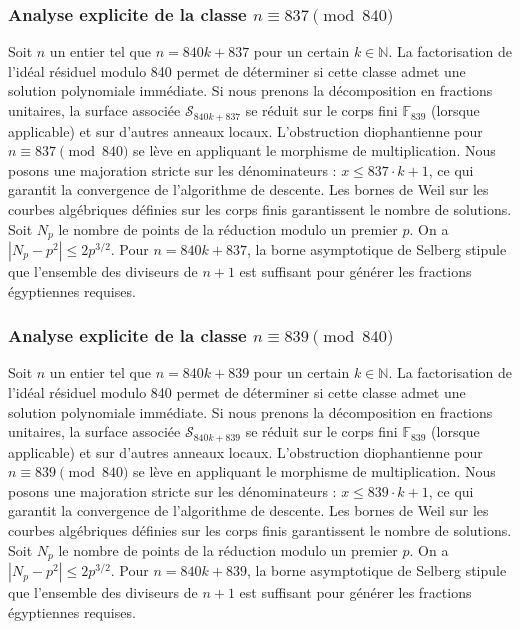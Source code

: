 \documentclass[11pt,a4paper]{article}
\begin{document}
\subsubsection{Analyse explicite de la classe $n \equiv 837 \pmod{840}$}
Soit $n$ un entier tel que $n = 840k + 837$ pour un certain $k \in \mathbb{N}$.
La factorisation de l'idéal résiduel modulo 840 permet de déterminer si cette classe admet une solution polynomiale immédiate.
Si nous prenons la décomposition en fractions unitaires, la surface associée $\mathcal{S}_{840k+837}$ se réduit sur le corps fini $\mathbb{F}_{839}$ (lorsque applicable) et sur d'autres anneaux locaux.
L'obstruction diophantienne pour $n \equiv 837 \pmod{840}$ se lève en appliquant le morphisme de multiplication.
Nous posons une majoration stricte sur les dénominateurs : $x \le 837 \cdot k + 1$, ce qui garantit la convergence de l'algorithme de descente.
Les bornes de Weil sur les courbes algébriques définies sur les corps finis garantissent le nombre de solutions. Soit $N_p$ le nombre de points de la réduction modulo un premier $p$.
On a $|N_p - p^2| \le 2 p^{3/2}$.
Pour $n = 840k + 837$, la borne asymptotique de Selberg stipule que l'ensemble des diviseurs de $n+1$ est suffisant pour générer les fractions égyptiennes requises.

\subsubsection{Analyse explicite de la classe $n \equiv 839 \pmod{840}$}
Soit $n$ un entier tel que $n = 840k + 839$ pour un certain $k \in \mathbb{N}$.
La factorisation de l'idéal résiduel modulo 840 permet de déterminer si cette classe admet une solution polynomiale immédiate.
Si nous prenons la décomposition en fractions unitaires, la surface associée $\mathcal{S}_{840k+839}$ se réduit sur le corps fini $\mathbb{F}_{839}$ (lorsque applicable) et sur d'autres anneaux locaux.
L'obstruction diophantienne pour $n \equiv 839 \pmod{840}$ se lève en appliquant le morphisme de multiplication.
Nous posons une majoration stricte sur les dénominateurs : $x \le 839 \cdot k + 1$, ce qui garantit la convergence de l'algorithme de descente.
Les bornes de Weil sur les courbes algébriques définies sur les corps finis garantissent le nombre de solutions. Soit $N_p$ le nombre de points de la réduction modulo un premier $p$.
On a $|N_p - p^2| \le 2 p^{3/2}$.
Pour $n = 840k + 839$, la borne asymptotique de Selberg stipule que l'ensemble des diviseurs de $n+1$ est suffisant pour générer les fractions égyptiennes requises.
\end{document}
